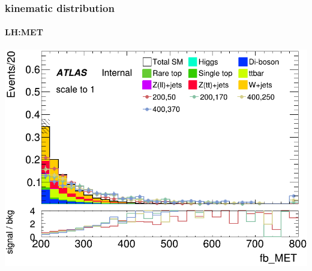 \documentclass[usenames,dvipsnames]{beamer}
\begin{document}
\begin{frame}
  \frametitle{kinematic distribution}
  \framesubtitle{LH:MET}
    \begin{minipage}{0.5\textwidth}
        \centering
        \includegraphics[width=\textwidth]{graphics/LH_met_sig/LH_fb_MET_norm.png}
    \end{minipage}
    \hfill
    \begin{minipage}{0.5\textwidth}
        \centering
        \setlength{\fboxsep}{0pt} %
        \setlength{\fboxrule}{1pt} %
    \end{minipage}
\end{frame}
\end{document}
